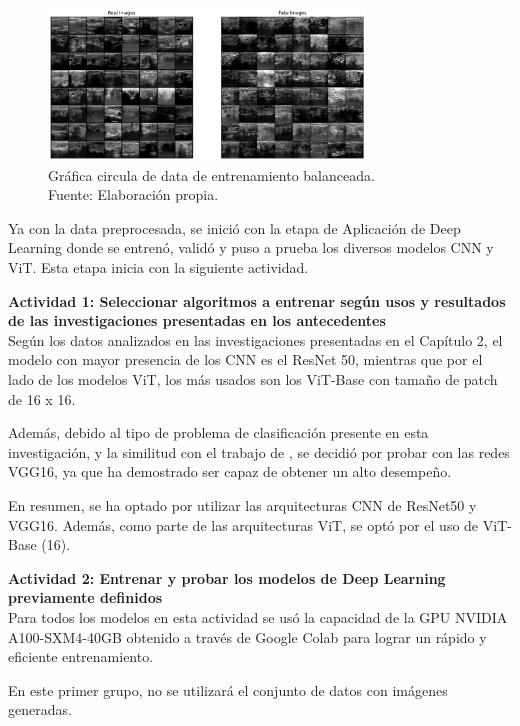 \begin{figure}[H]
	\begin{center}
		\includegraphics[width=0.75\textwidth]{4/figures/generated_real_2.png}
		\caption[Gráfica circula de data de entrenamiento balanceada]{Gráfica circula de data de entrenamiento balanceada. \\
		Fuente: Elaboración propia.}
		\label{4:fig119}
	\end{center}
\end{figure}

Ya con la data preprocesada, se inició con la etapa de Aplicación de Deep Learning donde se entrenó, validó y puso a prueba los diversos modelos CNN y ViT. Esta etapa inicia con la siguiente actividad.

\textbf{Actividad 1: Seleccionar algoritmos a entrenar según usos y resultados de las investigaciones presentadas en los antecedentes}
\\
Según los datos analizados en las investigaciones presentadas en el Capítulo 2, el modelo con mayor presencia de los CNN es el ResNet 50, mientras que por el lado de los modelos ViT, los más usados son los ViT-Base con tamaño de patch de 16 x 16.

Además, debido al tipo de problema de clasificación presente en esta investigación, y la similitud con el trabajo de \cite{pr_JERBI2023autoclassViTGAN}, se decidió por probar con las redes VGG16, ya que ha demostrado ser capaz de obtener un alto desempeño.

En resumen, se ha optado por utilizar las arquitecturas CNN de ResNet50 y VGG16. Además, como parte de las arquitecturas ViT, se optó por el uso de ViT-Base (16).

\textbf{Actividad 2: Entrenar y probar los modelos de Deep Learning previamente definidos}
\\
Para todos los modelos en esta actividad se usó la capacidad de la GPU NVIDIA A100-SXM4-40GB obtenido a través de Google Colab para lograr un rápido y eficiente entrenamiento.

En este primer grupo, no se utilizará el conjunto de datos con imágenes generadas.

